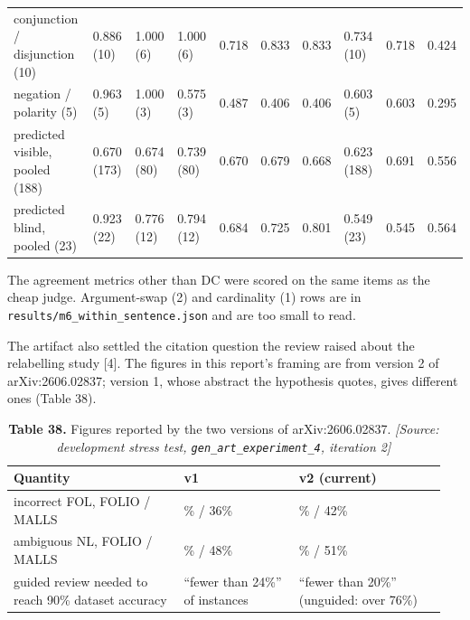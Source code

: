 \documentclass[11pt,letterpaper]{article}
\begin{document}
\begin{landscape}
{\begin{longtable}
{}conjunction / disjunction (10) & 0.886 (10) & 1.000 (6) & 1.000 (6) & 0.718 & 0.833 & 0.833 & 0.734 (10) & 0.718 & 0.424 \\
{}negation / polarity (5) & 0.963 (5) & 1.000 (3) & 0.575 (3) & 0.487 & 0.406 & 0.406 & 0.603 (5) & 0.603 & 0.295 \\
{}predicted visible, pooled (188) & 0.670 (173) & 0.674 (80) & 0.739 (80) & 0.670 & 0.679 & 0.668 & 0.623 (188) & 0.691 & 0.556 \\
{}predicted blind, pooled (23) & 0.923 (22) & 0.776 (12) & 0.794 (12) & 0.684 & 0.725 & 0.801 & 0.549 (23) & 0.545 & 0.564 \\
\end{longtable}
}
\end{landscape}

The agreement metrics other than DC were scored on the same items as the cheap judge. Argument-swap (2) and cardinality (1) rows are in \texttt{results/\allowbreak{}m6\_\allowbreak{}\allowbreak{}within\_\allowbreak{}\allowbreak{}sentence.json} and are too small to read.

The artifact also settled the citation question the review raised about the relabelling study [4]. The figures in this report's framing are from version 2 of arXiv:2606.02837; version 1, whose abstract the hypothesis quotes, gives different ones (Table 38).

\begin{table}[H]
\centering
\small
\setlength{\tabcolsep}{3pt}
\caption*{\textbf{Table 38.} Figures reported by the two versions of arXiv:2606.02837. \textit{[Source: development stress test, \texorpdfstring{\textup{\nolinkurl{gen_art_experiment_4}}}{gen art experiment 4}, iteration 2]}}
\begin{tabular}{>{\raggedright\arraybackslash}p{0.371\linewidth}>{\raggedright\arraybackslash}p{0.255\linewidth}>{\raggedright\arraybackslash}p{0.326\linewidth}}
\toprule
\textbf{Quantity} & \textbf{v1} & \textbf{v2 (current)} \\
\midrule
{}incorrect FOL, FOLIO / MALLS & 39\% / 36\% & 42.5\% / 42\% \\
{}ambiguous NL, FOLIO / MALLS & 16.4\% / 48\% & 17.8\% / 51\% \\
{}guided review needed to reach 90\% dataset accuracy & ``fewer than 24\%'' of instances & ``fewer than 20\%'' (unguided: over 76\%) \\
\bottomrule
\end{tabular}
\end{table}
\end{document}
